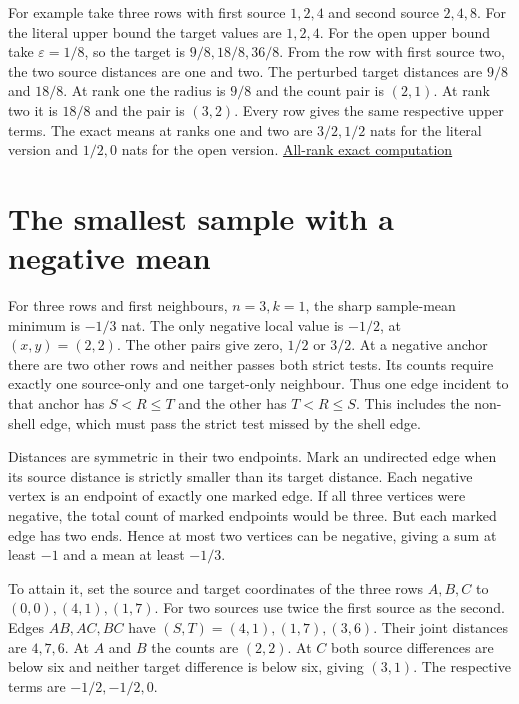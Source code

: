 For example take three rows with first source \(1,2,4\) and second source \(2,4,8\). For the literal upper bound the target values are \(1,2,4\). For the open upper bound take \(\varepsilon=1/8\), so the target is \(9/8,18/8,36/8\). From the row with first source two, the two source distances are one and two. The perturbed target distances are \(9/8\) and \(18/8\). At rank one the radius is \(9/8\) and the count pair is \((2,1)\). At rank two it is \(18/8\) and the pair is \((3,2)\). Every row gives the same respective upper terms. The exact means at ranks one and two are \(3/2,1/2\) nats for the literal version and \(1/2,0\) nats for the open version. \href{https://github.com/sepahead/pid-rs/blob/main/audit/research/strict-neighbour-count-geometry/whole_upper.py}{All-rank exact computation}

\clearpage

\section{The smallest sample with a negative mean}\label{the-smallest-sample-with-a-negative-mean}

For three rows and first neighbours, \(n=3,k=1\), the sharp sample-mean minimum is \(-1/3\) nat. The only negative local value is \(-1/2\), at \((x,y)=(2,2)\). The other pairs give zero, \(1/2\) or \(3/2\). At a negative anchor there are two other rows and neither passes both strict tests. Its counts require exactly one source-only and one target-only neighbour. Thus one edge incident to that anchor has \(S<R\le T\) and the other has \(T<R\le S\). This includes the non-shell edge, which must pass the strict test missed by the shell edge.

Distances are symmetric in their two endpoints. Mark an undirected edge when its source distance is strictly smaller than its target distance. Each negative vertex is an endpoint of exactly one marked edge. If all three vertices were negative, the total count of marked endpoints would be three. But each marked edge has two ends. Hence at most two vertices can be negative, giving a sum at least \(-1\) and a mean at least \(-1/3\).

To attain it, set the source and target coordinates of the three rows \(A,B,C\) to \((0,0),(4,1),(1,7)\). For two sources use twice the first source as the second. Edges \(AB,AC,BC\) have \((S,T)=(4,1),(1,7),(3,6)\). Their joint distances are \(4,7,6\). At \(A\) and \(B\) the counts are \((2,2)\). At \(C\) both source differences are below six and neither target difference is below six, giving \((3,1)\). The respective terms are \(-1/2,-1/2,0\).


